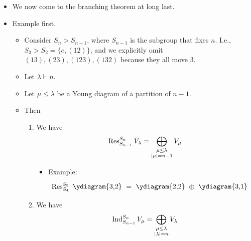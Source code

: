 \documentclass[../notes.tex]{subfiles}
\begin{document}
\begin{itemize}
\begin{proof}
\begin{align*}
            &= (\chi_V|_H,\chi_W)_H\\
            &= (\chi_{\res_H^GV},\chi_W)_H
        \end{align*}
        From line 4 to line 5: Fix $h$; then $g_2g_1g_2^{-1}=h$ iff $g_1=g_2^{-1}hg_2$, so we have overcounted by $|G|$ times. From line 5 to line 6: $\tilde{\chi}_W$ is zero whenever $h^{-1}\notin H$, so this ostensible sum over all $h\in G$ is \emph{de facto} only a sum over all $h\in H$; this is what allows us to consider $\chi_V$ as "restricted to $H$" in line 6.
    \end{proof}
    \item We now come to the branching theorem at long last.
    \item Example first.
    \begin{itemize}
        \item Consider $S_n>S_{n-1}$, where $S_{n-1}$ is the subgroup that fixes $n$. I.e., $S_3>S_2=\{e,(12)\}$, and we explicitly omit $(13),(23),(123),(132)$ because they all move 3.
        \item Let $\lambda\vdash n$.
        \item Let $\mu\leq\lambda$ be a Young diagram of a partition of $n-1$.
        \item Then
        \begin{enumerate}
            \item We have
            \begin{equation*}
                \operatorname{Res}_{S_{n-1}}^{S_n}V_\lambda = \bigoplus_{\substack{\mu\leq\lambda\\|\mu|=n-1}}V_\mu
            \end{equation*}
            \begin{itemize}
                \item Example:
                \begin{equation*}
                    \res_{S_4}^{S_5}\tikz[baseline={(0,-0.1)}]{\node{\ydiagram{3,2}};}
                    = \tikz[baseline={(0,-0.1)}]{\node{\ydiagram{2,2}};}
                    \oplus\tikz[baseline={(0,-0.1)}]{\node{\ydiagram{3,1}};}
                \end{equation*}
            \end{itemize}
            \item We have
            \begin{equation*}
                \operatorname{Ind}_{S_{n-1}}^{S_n}V_\mu = \bigoplus_{\substack{\mu\leq\lambda\\|\lambda|=n}}V_\lambda
            \end{equation*}

\end{enumerate}
\end{itemize}
\end{itemize}
\end{document}
